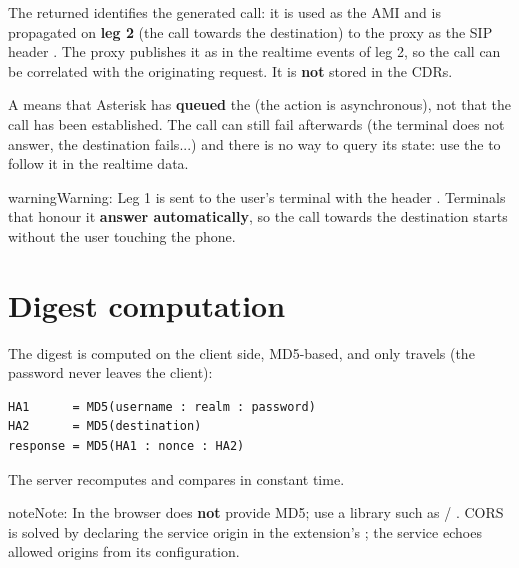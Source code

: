 \documentclass[letterpaper,10pt,english]{sphinxmanual}
\begin{document}
The returned  identifies the generated call: it is used as the AMI
 and is propagated on \textbf{leg 2} (the call towards the destination) to
the proxy as the SIP header . The proxy publishes it as
 in the realtime events of leg 2, so the call can be correlated with the
originating  request. It is \textbf{not} stored in the CDRs.

A  means that Asterisk has \textbf{queued} the  (the action is
asynchronous), not that the call has been established. The call can still fail
afterwards (the terminal does not answer, the destination fails...) and there is no
way to query its state: use the  to follow it in the realtime data.

\begin{notice}{warning}{Warning:}
Leg 1 is sent to the user's terminal with the header
. Terminals that honour it \textbf{answer
automatically}, so the call towards the destination starts without the user
touching the phone.
\end{notice}


\section{Digest computation}
\label{api_rest/click2call:digest-computation}
The digest is computed on the client side, MD5-based, and only 
travels (the password never leaves the client):

\begin{Verbatim}[commandchars=\\\{\}]
HA1      = MD5(username : realm : password)
HA2      = MD5(destination)
response = MD5(HA1 : nonce : HA2)
\end{Verbatim}

The server recomputes and compares in constant time.

\begin{notice}{note}{Note:}
In the browser  does \textbf{not} provide MD5; use a library such as
 / . CORS is solved by declaring the service origin in
the extension's ; the service echoes allowed origins from its
configuration.
\end{notice}
\end{document}
